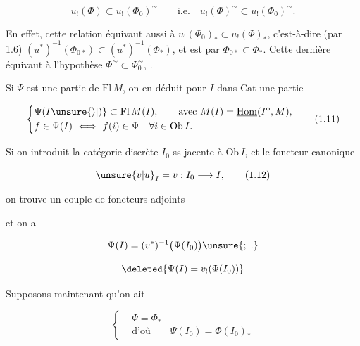 \[
u_!(\Phi)\subset u_!(\Phi_0)^{\sim}\qquad\text{i.e.}\quad u_!(\Phi)^{\sim}\subset u_!(\Phi_0)^{\sim}.
\]

En effet, cette relation équivaut aussi à
$u_!(\Phi_0)_*\subset u_!(\Phi)_*$, c'est-à-dire (par 1.6)
$(u^*)^{-1}(\Phi_{0*})\subset(u^*)^{-1}(\Phi_*)$, et est 
par $\Phi_{0*}\subset\Phi_*$. Cette dernière 
équivaut à l'hypothèse $\Phi^{\sim}\subset\Phi_0^{\sim}$, .

\unsure{!}
 Si $\Psi$ est une partie de $\mathrm{Fl}\,M$, on en déduit
pour  $I$ dans $\mathrm{Cat}$ une partie

\[
\left\{\begin{aligned}
&\Psi(I\unsure{\rangle|)}\subset\mathrm{Fl}\,M(I),\qquad\text{avec }M(I)=\underline{\mathrm{Hom}}(I^{\mathrm o},M),\\
&f\in\Psi(I)\ \Longleftrightarrow\ f(i)\in\Psi\quad \forall i\in\mathrm{Ob}\,I.
\end{aligned}\right.\tag*{(1.11)}
\]

 Si on introduit la catégorie discrète $I_0$
ss-jacente à $\mathrm{Ob}\,I$, et le foncteur canonique

\[
\unsure{v|u}_I=v:I_0\longrightarrow I,\tag*{(1.12)}
\]

on trouve un couple de foncteurs adjoints


et on a

\[
\Psi(I)=(v^*)^{-1}\big(\Psi(I_0)\big)\unsure{;|.}
\]

\[
\deleted{\Psi(I)=v_!(\Phi(I_0))}
\]

Supposons maintenant qu'on ait

\[
\left\{\begin{aligned}
&\Psi=\Phi_*\\
&\text{d'où}\qquad\Psi(I_0)=\Phi(I_0)_*
\end{aligned}\right.\tag*{(1.14)}
\]

